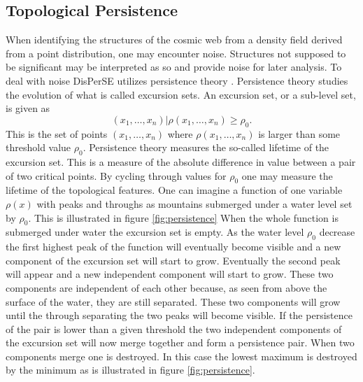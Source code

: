 \subsection{Topological Persistence}\label{sec:persistence}
When identifying the structures of the cosmic web from a density field derived
from a point distribution, one may
encounter noise. Structures not supposed to be significant may be interpreted as
so and provide noise for later analysis. To deal with noise DisPerSE utilizes
persistence theory \cite{persistence}. Persistence theory studies the evolution
of what is called excursion sets. An excursion set, or a sub-level set, is given as
\begin{equation}
    (x_1,\dots, x_n)\vert\rho(x_1,\dots, x_n)\geq\rho_0.
\end{equation}
This is the set of points $(x_1,\dots, x_n)$ where $\rho(x_1,\dots, x_n)$ is
larger than some threshold value $\rho_0$. Persistence theory measures the so-called
lifetime of the excursion set. This is a measure of the absolute
difference in value between a pair of two critical points. By cycling through
values for $\rho_0$ one may measure the lifetime of the topological features.
One can imagine a function of one variable $\rho(x)$ with peaks and throughs as
mountains submerged under a water level set by $\rho_0$. This is illustrated in
figure \ref{fig:persistence}
When the whole function is submerged under water the excursion set is empty. As
the water level $\rho_0$ decrease the first highest peak of the function will
eventually become visible and a new component of the excursion set will start to
grow. Eventually the second peak will appear and a new independent component
will start to grow. These two components are independent of each other because,
as seen from above the surface of the water, they are still separated. These two
components will grow until the through separating the two peaks will become
visible. If the persistence of the pair is lower than a given threshold the two independent components of the excursion set will now merge
together and form a persistence pair. When two components merge one is
destroyed. In this case the lowest maximum is destroyed by the minimum as is
illustrated in figure \ref{fig:persistence}.\\

